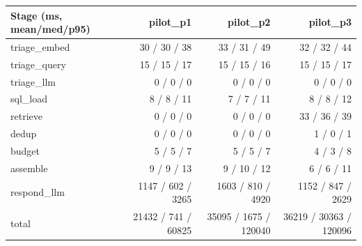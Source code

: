 \begin{tabular}{lrrr}
\toprule
Stage (ms, mean/med/p95) & pilot\_p1 & pilot\_p2 & pilot\_p3 \\
\midrule
triage\_embed & 30 / 30 / 38 & 33 / 31 / 49 & 32 / 32 / 44 \\
triage\_query & 15 / 15 / 17 & 15 / 15 / 16 & 15 / 15 / 17 \\
triage\_llm & 0 / 0 / 0 & 0 / 0 / 0 & 0 / 0 / 0 \\
sql\_load & 8 / 8 / 11 & 7 / 7 / 11 & 8 / 8 / 12 \\
retrieve & 0 / 0 / 0 & 0 / 0 / 0 & 33 / 36 / 39 \\
dedup & 0 / 0 / 0 & 0 / 0 / 0 & 1 / 0 / 1 \\
budget & 5 / 5 / 7 & 5 / 5 / 7 & 4 / 3 / 8 \\
assemble & 9 / 9 / 13 & 9 / 10 / 12 & 6 / 6 / 11 \\
respond\_llm & 1147 / 602 / 3265 & 1603 / 810 / 4920 & 1152 / 847 / 2629 \\
total & 21432 / 741 / 60825 & 35095 / 1675 / 120040 & 36219 / 30363 / 120096 \\
\bottomrule
\end{tabular}
